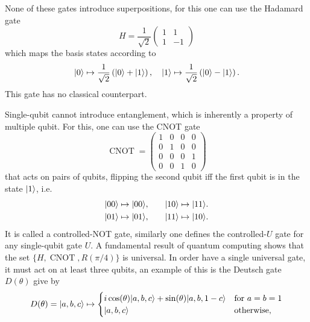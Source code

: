 \documentclass[a4paper,10pt,oneside]{book}
\theoremstyle{plain}
\theoremstyle{definition}
\theoremstyle{remark}
\DeclarePairedDelimiter\ket{\lvert}{\rangle}
\begin{document}
None of these gates introduce superpositions, for this one can use the Hadamard gate
\begin{equation}\label{eq:hadamard}
  H = \frac{1}{\sqrt{2}} \begin{pmatrix} 1 & 1 \\ 1 & -1 \end{pmatrix}
\end{equation}
which maps the basis states according to
\begin{equation}
  \ket{0} \mapsto \frac{1}{\sqrt{2}} \left( \ket{0} + \ket{1} \right), \quad
  \ket{1} \mapsto \frac{1}{\sqrt{2}} \left( \ket{0} - \ket{1} \right).
\end{equation}
This gate has no classical counterpart.

Single-qubit cannot introduce entanglement, which is inherently a property of multiple qubit. For this, one can use the CNOT gate
\begin{equation}
  \operatorname{CNOT} =
  \begin{pmatrix}
    1 & 0 & 0 & 0 \\
    0 & 1 & 0 & 0 \\
    0 & 0 & 0 & 1 \\
    0 & 0 & 1 & 0
  \end{pmatrix}
\end{equation}
that acts on pairs of qubits, flipping the second qubit iff the first qubit is in the state $\ket{1}$, i.e.
\begin{equation}
  \begin{aligned}
    \ket{00} \mapsto \ket{00},\quad &\quad \ket{10} \mapsto \ket{11}. \\
    \ket{01} \mapsto \ket{01},\quad &\quad \ket{11} \mapsto \ket{10}.
  \end{aligned}
\end{equation}
It is called a controlled-NOT gate, similarly one defines the controlled-$U$ gate for any single-qubit gate $U$. A fundamental result of quantum computing shows that the set $\{H, \operatorname{CNOT}, R(\pi/4)\}$ is universal. In order have a single universal gate, it must act on at least three qubits, an example of this is the Deutsch gate $D(\theta)$ give by
\begin{equation}
  D(\theta) = \ket{a,b,c} \mapsto
  \begin{cases}
    i \cos(\theta) \ket{a,b,c} + \sin(\theta) \ket{a,b,1-c} & \mbox{for }a=b=1 \\
    \ket{a,b,c} & \mbox{otherwise,}
  \end{cases}
\end{equation}
\end{document}
